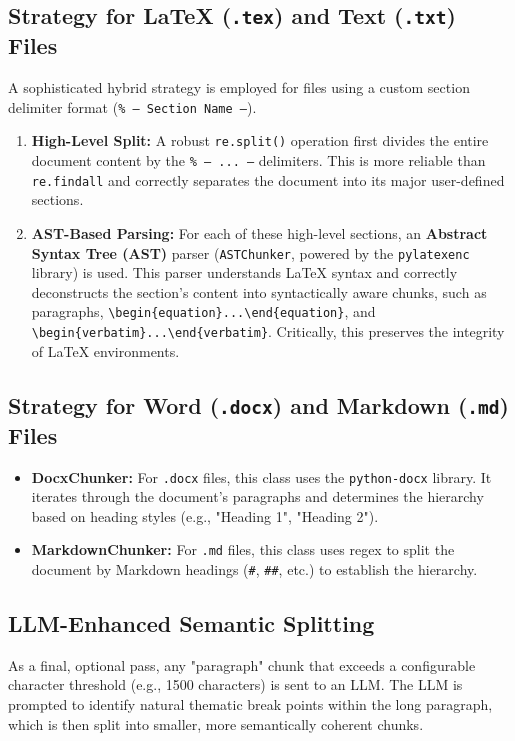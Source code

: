 \documentclass{article}
\begin{document}
\subsection{Strategy for LaTeX (\texttt{.tex}) and Text (\texttt{.txt}) Files}
A sophisticated hybrid strategy is employed for files using a custom section delimiter format (\texttt{\% --- Section Name ---}).
\begin{enumerate}
    \item \textbf{High-Level Split:} A robust \texttt{re.split()} operation first divides the entire document content by the \texttt{\% --- ... ---} delimiters. This is more reliable than \texttt{re.findall} and correctly separates the document into its major user-defined sections.
    \item \textbf{AST-Based Parsing:} For each of these high-level sections, an \textbf{Abstract Syntax Tree (AST)} parser (\texttt{ASTChunker}, powered by the \texttt{pylatexenc} library) is used. This parser understands LaTeX syntax and correctly deconstructs the section's content into syntactically aware chunks, such as paragraphs, \texttt{\textbackslash begin\{equation\}...\textbackslash end\{equation\}}, and \texttt{\textbackslash begin\{verbatim\}...\textbackslash end\{verbatim\}}. Critically, this preserves the integrity of LaTeX environments.
\end{enumerate}

\subsection{Strategy for Word (\texttt{.docx}) and Markdown (\texttt{.md}) Files}
\begin{itemize}
    \item \textbf{DocxChunker:} For \texttt{.docx} files, this class uses the \texttt{python-docx} library. It iterates through the document's paragraphs and determines the hierarchy based on heading styles (e.g., "Heading 1", "Heading 2").
    \item \textbf{MarkdownChunker:} For \texttt{.md} files, this class uses regex to split the document by Markdown headings (\texttt{\#}, \texttt{\#\#}, etc.) to establish the hierarchy.
\end{itemize}

\subsection{LLM-Enhanced Semantic Splitting}
As a final, optional pass, any "paragraph" chunk that exceeds a configurable character threshold (e.g., 1500 characters) is sent to an LLM. The LLM is prompted to identify natural thematic break points within the long paragraph, which is then split into smaller, more semantically coherent chunks.
\end{document}
